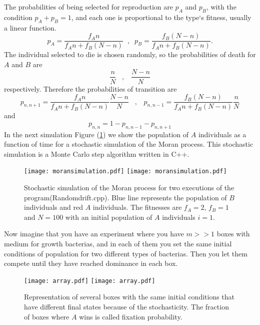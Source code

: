 The probabilities of being selected for reproduction are $p_{A}$ and $p_{B}$, with the condition $p_{A}+p_{B}=1$, and each one is proportional to the type`s fitness, usually a linear function\cite{Shoresh2011}.
\begin{equation}
p_{A}=\frac{f_{A}n}{f_{A}n+f_{B}(N-n)} \;\; , \;\; p_{B}=\frac{f_{B}(N-n)}{f_{A}n+f_{B}(N-n)}.
\end{equation}  
The individual selected to die is chosen randomly, so the probabilities of  death for $A$ and $B$ are
\begin{equation}
\frac{n}{N}\;\;\; , \;\;\; \frac{N-n}{N}
\end{equation}
respectively. Therefore the probabilities of transition are
\begin{equation}
p_{n,n+1}=\frac{f_{A}n}{f_{A}n+f_{B}(N-n)} \frac{N-n}{N} \;\;\; , \;\;\; p_{n,n-1}=\frac{f_{B}(N-n)}{f_{A}n+f_{B}(N-n)}\frac{n}{N}
\end{equation}
and 
\begin{equation}
p_{n,n}=1-p_{n,n-1}-p_{n,n+1}
\end{equation}
In the next simulation Figure (\ref{Fig44}) we show the population of $A$ individuals as a function of time for a stochastic simulation of the Moran process. This stochastic simulation is a Monte Carlo step algorithm written in C++.
\begin{figure}[H]
 \begin{center}
    \leavevmode
    \ifpdf
      \texttt{[image: moransimulation.pdf]}
    \else
     \texttt{[image: moransimulation.pdf]}
    \fi
    \caption{\footnotesize Stochastic simulation of the Moran process for two executions of the program(Randomdrift.cpp). Blue line represents the population of $B$ individuals and red $A$ individuals. The fitnesses are $f_{A}=2$, $f_{B}=1$ and $N=100$ with an initial population of $A$ individuals $i=1$.}
    \label{Fig44}
  \end{center}
  \end{figure}
Now imagine that you have an experiment where you have $m>>1$ boxes with medium for growth bacterias, and in each of them you set the same initial conditions of population for two different types of bacterias. Then you let them compete until they have reached dominance in each box. 

\begin{figure}[H]
 \begin{center}
    \leavevmode
    \ifpdf
      \texttt{[image: array.pdf]}
    \else
     \texttt{[image: array.pdf]}
    \fi
    \caption{\footnotesize Representation of several boxes with the same initial conditions that have different final states because of the stochasticity. The fraction of boxes where $A$ wins is called fixation probability.}  
    \label{Fig45}
  \end{center}
  \end{figure}


